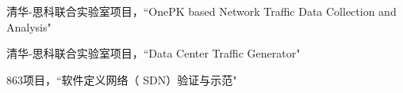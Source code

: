 \begin{resume}
\begin{enumerate}[{[}1{]}]
\item 清华-思科联合实验室项目，``OnePK based Network Traffic Data Collection and Analysis"
\item 清华-思科联合实验室项目，``Data Center Traffic Generator"
\item 863项目，``软件定义网络（ SDN）验证与示范"

\end{enumerate}
\end{resume}
